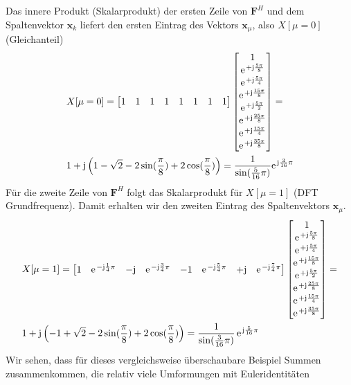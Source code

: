 \begin{ExCalc}
Das innere Produkt (Skalarprodukt) der ersten Zeile von $\bm{F}^H$ und dem
Spaltenvektor $\bm{x}_k$ liefert den ersten Eintrag des Vektors $\bm{x}_\mu$, also
$X[\mu=0]$ (Gleichanteil)
\begin{align}
&X[\mu=0] =
\begin{bmatrix}
1 & 1 & 1 & 1 & 1 & 1 & 1 & 1
\end{bmatrix}
\begin{bmatrix}
1\\
\e^{+\im \frac{5\pi}{8}}\\
\e^{+\im \frac{5\pi}{4}}\\
\e^{+\im \frac{15\pi}{8}}\\
\e^{+\im \frac{5\pi}{2}}\\
\e^{+\im \frac{25\pi}{8}}\\
\e^{+\im \frac{15\pi}{4}}\\
\e^{+\im \frac{35\pi}{8}}
\end{bmatrix}
=\\
&1 + \im \left(1 - \sqrt{2} - 2\sin(\frac{\pi}{8}) + 2\cos(\frac{\pi}{8})\right)
= \frac{1}{\sin(\frac{5}{16}\pi)} \e^{\im\frac{3}{16}\pi}
\end{align}
%
Für die zweite Zeile von $\bm{F}^H$ folgt das Skalarprodukt für
$X[\mu=1]$ (DFT Grundfrequenz). Damit erhalten wir den zweiten Eintrag des
Spaltenvektors $\bm{x}_\mu$.
\begin{align}
&X[\mu=1] =
\begin{bmatrix}
1 & \e^{-\im\frac{1}{4}\pi} & -\im & \e^{-\im\frac{3}{4}\pi} & -1 & \e^{-\im\frac{5}{4}\pi} & +\im & \e^{-\im\frac{7}{4}\pi}
\end{bmatrix}
\begin{bmatrix}
1\\
\e^{+\im \frac{5\pi}{8}}\\
\e^{+\im \frac{5\pi}{4}}\\
\e^{+\im \frac{15\pi}{8}}\\
\e^{+\im \frac{5\pi}{2}}\\
\e^{+\im \frac{25\pi}{8}}\\
\e^{+\im \frac{15\pi}{4}}\\
\e^{+\im \frac{35\pi}{8}}
\end{bmatrix}
=\\
&1 + \im \left(-1 + \sqrt{2} - 2\sin(\frac{\pi}{8}) + 2\cos(\frac{\pi}{8})\right)=
\frac{1}{\sin(\frac{3}{16}\pi)}\,\e^{\im\frac{5}{16}\pi}
\end{align}
%
Wir sehen, dass für dieses vergleichsweise überschaubare Beispiel
Summen zusammenkommen, die relativ viele Umformungen mit Euleridentitäten

\end{ExCalc}
